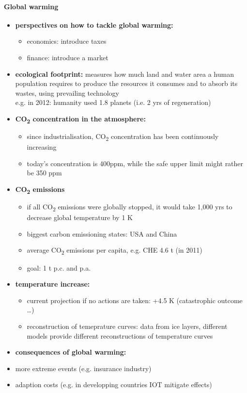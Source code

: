 \documentclass[a4paper,landscape,8pt,fleqn]{scrartcl}
\renewcommand{\emph}[1]{\textbf{#1}}
\begin{document}
\begin{multicols*}{4}
\paragraph{Global warming}
\begin{itemize}
\item \emph{perspectives on how to tackle global warming:}
\begin{itemize}
\item economics: introduce taxes
\item finance: introduce a market
\end{itemize}
\item \emph{ecological footprint:} measures how much land and water area a human population requires to produce the resources it consumes and to absorb its wastes, using prevailing technology \\
e.g. in 2012: humanity used 1.8 planets (i.e. 2 yrs of regeneration)
\item \emph{CO\textsubscript{2} concentration in the atmosphere:}
\begin{itemize}
\item since industrialisation, CO\textsubscript{2} concentration has been continuously increasing
\item today's concentration is 400ppm, while the safe upper limit might rather be 350 ppm
\end{itemize}
\item \emph{CO\textsubscript{2} emissions}
\begin{itemize}
\item if all CO\textsubscript{2} emissions were globally stopped, it would take 1,000 yrs to decrease global temperature by 1 K
\item biggest carbon emissioning states: USA and China
\item average CO\textsubscript{2} emissions per capita, e.g. CHE 4.6 t (in 2011)
\item goal: 1 t p.c. and p.a.
\end{itemize}
\item \emph{temperature increase:}
\begin{itemize}
\item current projection if no actions are taken: +4.5 K (catastrophic outcome \ldots)
\item reconstruction of temeprature curves: data from ice layers, different models provide different reconstructions of temperature curves
\end{itemize}
\item \emph{consequences of global warming:}
\item more extreme events (e.g. insurance industry)
\item adaption costs (e.g. in developping countries IOT mitigate effects)
\end{itemize}


\end{multicols*}
\end{document}
